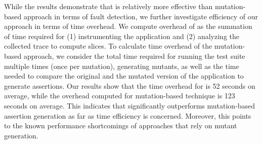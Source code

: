 While the results demonstrate that \tool is relatively more effective than mutation-based approach in terms of fault detection, we further investigate efficiency of our approach in terms of time overhead. We compute overhead of \tool as the summation of time required for (1) instrumenting the application and (2) analyzing the collected trace to compute \javascript slices. To calculate time overhead of the mutation-based approach, we consider the total time required for running the test suite multiple times (once per mutation), generating mutants, as well as the time needed to compare the original and the mutated version of the application to generate assertions.    
Our results show that the time overhead for \tool is 52 seconds on average, while the overhead computed for mutation-based technique is 123 seconds on average. This indicates that \tool significantly outperforms mutation-based assertion generation as far as time efficiency is concerned. Moreover, this points to the known performance shortcomings of approaches that rely on mutant generation.       


